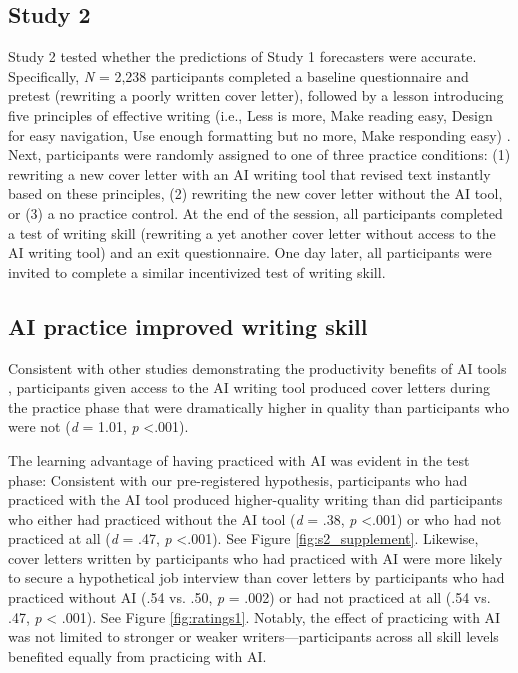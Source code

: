 \documentclass[11pt]{report}
\begin{document}
\begin{mainf}
\section{Study 2} 


Study 2 tested whether the predictions of Study 1 forecasters were
accurate. Specifically, \textit{N} = 2,238 participants completed a
baseline questionnaire and pretest (rewriting a poorly written cover
letter), followed by a lesson introducing five principles of effective
writing (i.e., Less is more, Make reading easy, Design for easy
navigation, Use enough formatting but no more, Make responding easy)
\cite{rogers2023}. 
Next, participants were randomly assigned to one of three practice conditions: (1) rewriting a new cover letter with an AI writing tool that revised text instantly based on these principles, (2) rewriting the new cover letter without the AI tool, or (3) a no practice control. 
At the end of the session, all
participants completed a test of writing skill (rewriting a yet another cover
letter without access to the AI writing tool) and an exit questionnaire.
One day later, all participants were invited to complete a similar
incentivized test of writing skill.


\subsection{AI practice improved writing skill}

Consistent with other studies demonstrating the productivity benefits of
AI tools \cite{dellacqua2023, noy2023}, participants given access to the
AI writing tool produced cover letters during the practice phase that
were dramatically higher in quality than participants who were not
(\emph{d} = 1.01, \emph{p} \textless.001).

The learning advantage of having practiced with AI was evident in the
test phase: Consistent with our pre-registered hypothesis, participants
who had practiced with the AI tool produced higher-quality writing than did
participants who either had practiced without the AI tool (\emph{d} = .38,
\emph{p} \textless.001) or who had not practiced at all (\emph{d} = .47,
\emph{p} \textless.001). See Figure \ref{fig:s2_supplement}.
Likewise, cover letters written by participants who had practiced with AI were more likely to secure a hypothetical job interview than cover letters by participants who had practiced without AI (.54 vs. .50, \textit{p} = .002) or had not practiced at all (.54 vs. .47, \textit{p} < .001). See Figure \ref{fig:ratings1}. Notably, the effect of practicing with AI was not limited to stronger or weaker writers---participants across all skill levels benefited equally from practicing with AI. 


\end{mainf}
\end{document}
